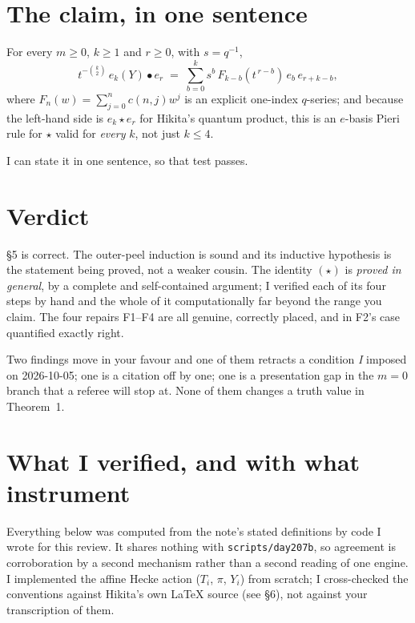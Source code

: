 \documentclass[11pt]{article}
\newcommand{\Fn}{F}
\begin{document}
\section{The claim, in one sentence}

For every $m\ge 0$, $k\ge 1$ and $r\ge 0$, with $s=q^{-1}$,
\[
  t^{-\binom{k}{2}}\,e_k(Y)\bullet e_r \;=\; \sum_{b=0}^{k} s^{b}\,\Fn_{k-b}\!\left(t^{\,r-b}\right)\,e_b\,e_{r+k-b},
\]
where $\Fn_n(w)=\sum_{j=0}^{n}c(n,j)w^j$ is an explicit one-index $q$-series; and because the
left-hand side is $e_k\star e_r$ for Hikita's quantum product, this is an $e$-basis Pieri rule
for $\star$ valid for \emph{every} $k$, not just $k\le 4$.

I can state it in one sentence, so that test passes.

\section{Verdict}

\S5 is correct. The outer-peel induction is sound and its inductive hypothesis is the
statement being proved, not a weaker cousin. The identity $(\star)$ is \emph{proved in
general}, by a complete and self-contained argument; I verified each of its four steps by
hand and the whole of it computationally far beyond the range you claim. The four repairs
F1--F4 are all genuine, correctly placed, and in F2's case quantified exactly right.

Two findings move in your favour and one of them retracts a condition \emph{I} imposed on
2026-10-05; one is a citation off by one; one is a presentation gap in the $m=0$ branch
that a referee will stop at. None of them changes a truth value in Theorem~1.

\section{What I verified, and with what instrument}

Everything below was computed from the note's stated definitions by code I wrote for this
review. It shares nothing with \texttt{scripts/day207b}, so agreement is corroboration by a
second mechanism rather than a second reading of one engine. I implemented the affine Hecke
action ($T_i$, $\pi$, $Y_i$) from scratch; I cross-checked the conventions against Hikita's
own \LaTeX{} source (see \S6), not against your transcription of them.
\end{document}
